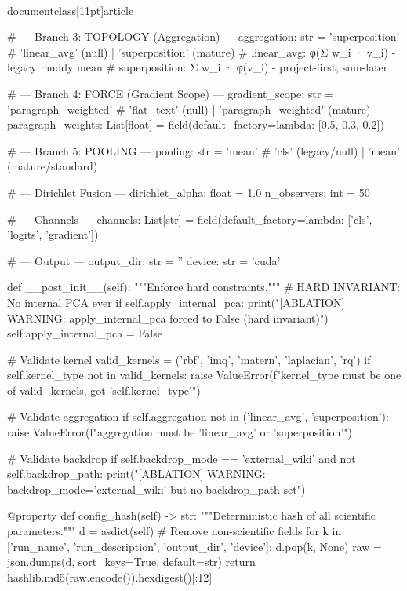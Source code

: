 \\documentclass[11pt]{article}
\begin{document}
\begin{CodeBlock}
    # --- Branch 3: TOPOLOGY (Aggregation) ---
    aggregation: str = 'superposition'  # 'linear_avg' (null) | 'superposition' (mature)
    # linear_avg: φ(Σ w_i · v_i) - legacy muddy mean
    # superposition: Σ w_i · φ(v_i) - project-first, sum-later

    # --- Branch 4: FORCE (Gradient Scope) ---
    gradient_scope: str = 'paragraph_weighted'  # 'flat_text' (null) | 'paragraph_weighted' (mature)
    paragraph_weights: List[float] = field(default_factory=lambda: [0.5, 0.3, 0.2])

    # --- Branch 5: POOLING ---
    pooling: str = 'mean'            # 'cls' (legacy/null) | 'mean' (mature/standard)

    # --- Dirichlet Fusion ---
    dirichlet_alpha: float = 1.0
    n_observers: int = 50

    # --- Channels ---
    channels: List[str] = field(default_factory=lambda: ['cls', 'logits', 'gradient'])

    # --- Output ---
    output_dir: str = ''
    device: str = 'cuda'

    def __post_init__(self):
        """Enforce hard constraints."""
        # HARD INVARIANT: No internal PCA ever
        if self.apply_internal_pca:
            print("[ABLATION] WARNING: apply_internal_pca forced to False (hard invariant)")
            self.apply_internal_pca = False

        # Validate kernel
        valid_kernels = ('rbf', 'imq', 'matern', 'laplacian', 'rq')
        if self.kernel_type not in valid_kernels:
            raise ValueError(f"kernel_type must be one of {valid_kernels}, got '{self.kernel_type}'")

        # Validate aggregation
        if self.aggregation not in ('linear_avg', 'superposition'):
            raise ValueError(f"aggregation must be 'linear_avg' or 'superposition'")

        # Validate backdrop
        if self.backdrop_mode == 'external_wiki' and not self.backdrop_path:
            print("[ABLATION] WARNING: backdrop_mode='external_wiki' but no backdrop_path set")

    @property
    def config_hash(self) -> str:
        """Deterministic hash of all scientific parameters."""
        d = asdict(self)
        # Remove non-scientific fields
        for k in ['run_name', 'run_description', 'output_dir', 'device']:
            d.pop(k, None)
        raw = json.dumps(d, sort_keys=True, default=str)
        return hashlib.md5(raw.encode()).hexdigest()[:12]


\end{CodeBlock}
\end{document}
